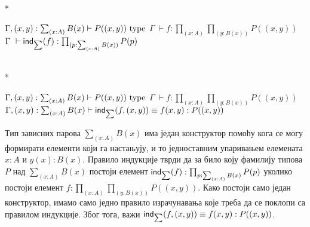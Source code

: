 \documentclass[12pt,oneside]{memoir}
\begin{document}
\begin{samepage}
    \begin{center}
        \begin{minipage}{.40\textwidth}
            \begin{prooftree}
            \end{prooftree}
        \end{minipage}
        \begin{minipage}{.45\textwidth}
            \begin{prooftree}
            \end{prooftree}
        \end{minipage}
        \\*
        \bigskip%
        \begin{minipage}{\textwidth}
            \begin{prooftree}
                \def\fCenter{\Gamma}
                \Axiom$\fCenter, (x, y) : \sum_{(x : A)} B(x) \vdash P((x, y))~\type$
                \noLine%
                \UnaryInf$\fCenter\ \vdash f : \prod_{(x : A)} \prod_{(y : B(x))} P((x, y))$
                \UnaryInf$\fCenter\ \vdash \ind{\sum} (f) : \prod_{(p : \sum_{(x:A)} B(x))} P(p)$
            \end{prooftree}
        \end{minipage}
        \\*
        \bigskip%
        \begin{minipage}{\textwidth}
            \begin{prooftree}
                \def\fCenter{\Gamma}
                \Axiom$\fCenter, (x, y) : \sum_{(x : A)} B(x) \vdash P((x, y))~\type$
                \noLine%
                \UnaryInf$\fCenter\ \vdash f : \prod_{(x : A)} \prod_{(y : B(x))} P((x, y))$
                \UnaryInf$\fCenter, (x, y) : \sum_{(x : A)} B(x) \vdash \ind{\sum} (f, (x, y)) \equiv f(x, y) : P((x, y))$
            \end{prooftree}
        \end{minipage}
    \end{center}
\end{samepage}

Тип зависних парова $\sum_{(x:A)} B (x)$ има један конструктор помоћу кога се могу формирати елементи који га настањују, и то једноставним упаривањем елемената $x : A$ и $y(x) : B(x)$. Правило индукције тврди да за било коју фамилију типова $P$ над $\sum_{(x : A)} B (x)$ постоји елемент $\mathsf{ind}_{\sum}(f) : \prod_{p : \sum_{(x : A)} B(x)} P (p)$ уколико постоји елемент $f : \prod_{(x : A)} \prod_{(y : B(x))} P ((x, y))$. Како постоји само један конструктор, имамо само једно правило израчунавања које треба да се поклопи са правилом индукције. Због тога, важи $\mathsf{ind}_{\sum}(f, (x, y)) \equiv f(x, y) : P((x, y))$.
\end{document}
